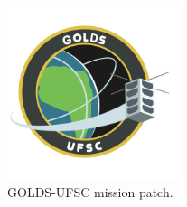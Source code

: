 \begin{figure}[!htb]
    \begin{center}
        \includegraphics[width=0.45\textwidth]{figures/golds-ufsc-patch.png}
        \caption{GOLDS-UFSC mission patch.}
        \label{fig:mission-patch}
    \end{center}
\end{figure}
